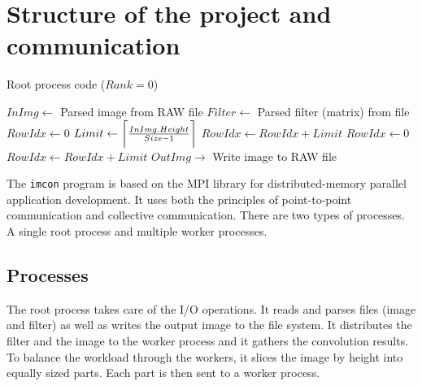 \documentclass[11pt,a4paper,oneside]{article}
\DeclarePairedDelimiter{\ceil}{\lceil}{\rceil}
\begin{document}


\section{Structure of the project and communication}

\begin{algorithm}
\caption{Root process code ($Rank = 0$)}
\begin{algorithmic}[1]
\State $InImg \gets$ Parsed image from RAW file
\State $Filter \gets$ Parsed filter (matrix) from file
\State {}
\State $RowIdx \gets 0$
\State $Limit \gets \ceil[\bigg]{\frac{InImg.Height}{Size - 1}}$
    \State {}
    \State $RowIdx \gets RowIdx + Limit$
\EndFor
\State $RowIdx \gets 0$
    \State {}
    \State $RowIdx \gets RowIdx + Limit$
\EndFor
\State $OutImg \rightarrow$ Write image to RAW file
\end{algorithmic}
\end{algorithm}

The \texttt{imcon} program is based on the MPI library for distributed-memory
parallel application development. It uses both the principles of point-to-point
communication and collective communication. There are two types of processes.
A single root process and multiple worker processes.

\subsection{Processes}

The root process takes care of the I/O operations. It reads and parses files
(image and filter) as well as writes the output image to the file system. It
distributes the filter and the image to the worker process and it gathers the
convolution results. To balance the workload through the workers, it slices
the image by height into equally sized parts. Each part is then sent to a
worker process.
\end{document}
